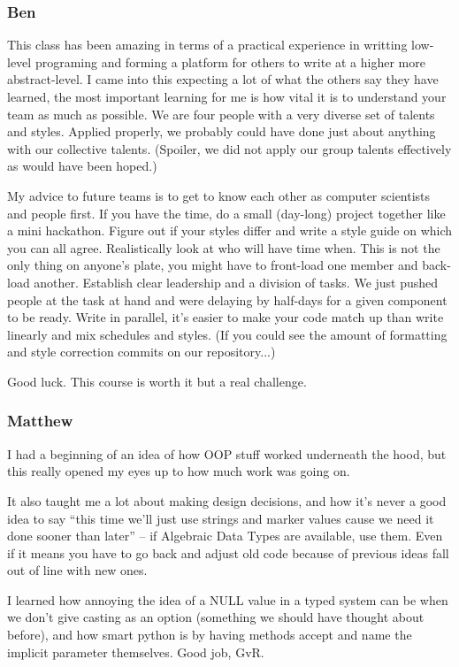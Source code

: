 \subsubsection*{ Ben}
This class has been amazing in terms of a practical experience in writting low-level programing and forming a platform for others to write at a higher more abstract-level. I came into this expecting a lot of what the others say they have learned, the most important learning for me is how vital it is to understand your team as much as possible. We are four people with a very diverse set of talents and styles. Applied properly, we probably could have done just about anything with our collective talents. (Spoiler, we did not apply our group talents effectively as would have been hoped.)

My advice to future teams is to get to know each other as computer scientists and people first. If you have the time, do a small (day-long) project together like a mini hackathon. Figure out if your styles differ and write a style guide on which you can all agree. Realistically look at who will have time when. This is not the only thing on anyone's plate, you might have to front-load one member and back-load another. Establish clear leadership and a division of tasks. We just pushed people at the task at hand and were delaying by half-days for a given component to be ready. Write in parallel, it's easier to make your code match up than write linearly and mix schedules and styles. (If you could see the amount of formatting and style correction commits on our repository...)

Good luck. This course is worth it but a real challenge.

\subsubsection*{ Matthew}
I had a beginning of an idea of how OOP stuff worked underneath the hood, but this really opened my eyes up to how much work was going on.

It also taught me a lot about making design decisions, and how it's never a good idea to say ``this time we'll just use strings and marker values cause we need it done sooner than later'' -- if Algebraic Data Types are available, use them. Even if it means you 
have to go back and adjust old code because of previous ideas fall out of line with new ones.

I learned how annoying the idea of a NULL value in a typed system can be when we don't give casting as an option (something we should have thought about before), and how smart python is by having methods accept and name the implicit parameter themselves. Good 
job, GvR.

